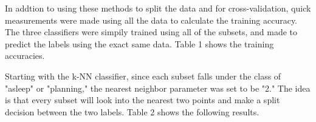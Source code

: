 \documentclass[conference,compsoc]{IEEEtran}
\begin{document}
In addtion to using these methods to split the data and for cross-validation, quick measurements were made using all the data to calculate the training accuracy. The three classifiers were 
simpily trained using all of the subsets, and made to predict the labels using the exact same data. Table 1 shows the training accuracies.

\begin{table}[h]
\noindent{}	
	\caption{Training Accuracies}
	\label{table1}
\end{table}

Starting with the k-NN classifier, since each subset falls under the class of "asleep" or "planning," the nearest neighbor parameter 
was set to be "2." The idea is that every subset will look into the nearest two points and make a split decision between the two labels. 
Table 2 shows the following results.
\begin{table*}[h]
	\noindent{}
	\caption{Accuracies for k-NN Classifier}
	\label{table2}
\end{table*}
\end{document}
